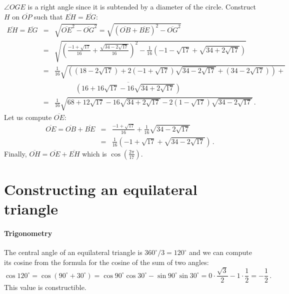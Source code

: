 \documentclass[11pt,a4paper]{article}
\newenvironment{form}[1]{%
\begin{displaymath}%
\renewcommand{\arraystretch}{#1}%
\begin{array}{lcl}}%
{\end{array}%
\end{displaymath}%
}
\newcommand*{\disfrac}[2]{\displaystyle\frac{#1}{#2}}
\begin{document}
$\angle OGE$ is a right angle since it is subtended by a diameter of the circle. Construct $H$ on $\overline{OP}$ such that $\overline{EH}=\overline{EG}$:
\begin{form}{2}
\overline{EH}=\overline{EG}&=&\sqrt{\overline{OE}^2-\overline{OG}^2}=\sqrt{(\overline{OB}+\overline{BE})^2-\overline{OG}^2}\\
&=&\sqrt{\left(\disfrac{-1+\sqrt{17}}{16}+\disfrac{\sqrt{34-2\sqrt{17}}}{16}\right)^2-
\disfrac{1}{16}\left(-1-\sqrt{17}+\sqrt{34+2\sqrt{17}}\right)}
\\
&=&\disfrac{1}{16}\sqrt{\left(
(18-2\sqrt{17})+ 2(-1+\sqrt{17})\sqrt{34-2\sqrt{17}}+
(34-2\sqrt{17})\right)+}\\
&&\quad\quad\quad\overline{
\left(16+16\sqrt{17}-16\sqrt{34+2\sqrt{17}}\right)}\\
&=&\disfrac{1}{16}\sqrt{
68+12\sqrt{17}-16\sqrt{34+2\sqrt{17}}-2(1-\sqrt{17})\sqrt{34-2\sqrt{17}}
}\,.
\end{form}
Let us compute $\overline{OE}$:
\begin{form}{2}
\overline{OE}=\overline{OB}+\overline{BE}&=&\disfrac{-1+\sqrt{17}}{16}+\disfrac{1}{16}\sqrt{34-2\sqrt{17}}\\
&=&\disfrac{1}{16}\left(-1+\sqrt{17}+\sqrt{34-2\sqrt{17}}\right)\,.
\end{form}
Finally, $\overline{OH}=\overline{OE}+\overline{EH}$ which is $\cos \left(\disfrac{2\pi}{17}\right)$.


\appendix
\section{Constructing an equilateral triangle}\label{a.triangle}

\paragraph{Trigonometry} The central angle of an equilateral triangle is $360^\circ/3=120^\circ$ and we can compute its cosine from the formula for the cosine of the sum of two angles:
\[
\cos 120^\circ = \cos(90^\circ+30^\circ)=\cos 90^\circ \cos 30^\circ  -\sin 90^\circ \sin 30^\circ = 0\cdot \frac{\sqrt{3}}{2} - 1\cdot \frac{1}{2}=-\disfrac{1}{2}\,.
\]
This value is constructible.
\end{document}
